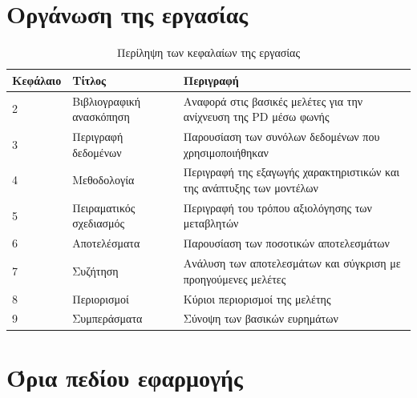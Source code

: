 \section{Οργάνωση της εργασίας}

\begin{table}[H]
    \centering
    \caption{Περίληψη των κεφαλαίων της εργασίας}
    \label{tab:thesis-organization}
    \begin{tabular}{@{}llp{8cm}@{}}
        \toprule
        \textbf{Κεφάλαιο} & \textbf{Τίτλος} & \textbf{Περιγραφή} \\
        \midrule
        2 & Βιβλιογραφική ανασκόπηση & Αναφορά στις βασικές μελέτες για την ανίχνευση της PD μέσω φωνής \\
        3 & Περιγραφή δεδομένων & Παρουσίαση των συνόλων δεδομένων που χρησιμοποιήθηκαν \\
        4 & Μεθοδολογία & Περιγραφή της εξαγωγής χαρακτηριστικών και της ανάπτυξης των μοντέλων \\
        5 & Πειραματικός σχεδιασμός & Περιγραφή του τρόπου αξιολόγησης των μεταβλητών \\
        6 & Αποτελέσματα & Παρουσίαση των ποσοτικών αποτελεσμάτων \\
        7 & Συζήτηση &  Ανάλυση των αποτελεσμάτων και σύγκριση με προηγούμενες μελέτες \\
        8 & Περιορισμοί &  Κύριοι περιορισμοί της μελέτης \\
        9 & Συμπεράσματα & Σύνοψη των βασικών ευρημάτων  \\
        \bottomrule
    \end{tabular}
\end{table}

\section{Όρια πεδίου εφαρμογής}

